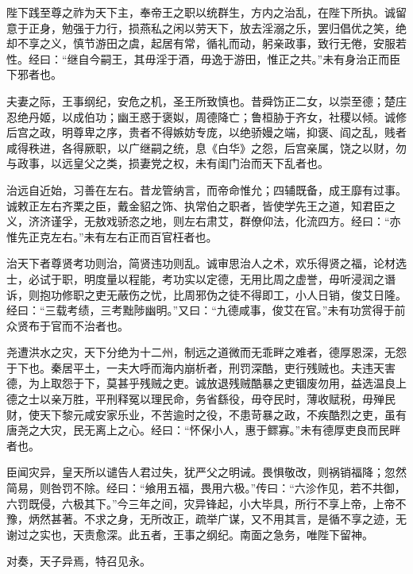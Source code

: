 \documentclass[12pt,UTF8]{ctexbook}
\begin{document}
陛下践至尊之祚为天下主，奉帝王之职以统群生，方内之治乱，在陛下所执。诚留意于正身，勉强于力行，损燕私之闲以劳天下，放去淫溺之乐，罢归倡优之笑，绝却不享之义，慎节游田之虞，起居有常，循礼而动，躬亲政事，致行无倦，安服若性。经曰：“继自今嗣王，其毋淫于酒，毋逸于游田，惟正之共。”未有身治正而臣下邪者也。



夫妻之际，王事纲纪，安危之机，圣王所致慎也。昔舜饬正二女，以崇至德；楚庄忍绝丹姬，以成伯功；幽王惑于褒姒，周德降亡；鲁桓胁于齐女，社稷以倾。诚修后宫之政，明尊卑之序，贵者不得嫉妨专庞，以绝骄嫚之端，抑褒、阎之乱，贱者咸得秩进，各得厥职，以广继嗣之统，息《白华》之怨，后宫亲属，饶之以财，勿与政事，以远皇父之类，损妻党之权，未有闺门治而天下乱者也。



治远自近始，习善在左右。昔龙管纳言，而帝命惟允；四辅既备，成王靡有过事。诚敕正左右齐栗之臣，戴金貂之饰、执常伯之职者，皆使学先王之道，知君臣之义，济济谨孚，无敖戏骄恣之地，则左右肃艾，群僚仰法，化流四方。经曰：“亦惟先正克左右。”未有左右正而百官枉者也。



治天下者尊贤考功则治，简贤违功则乱。诚审思治人之术，欢乐得贤之福，论材选士，必试于职，明度量以程能，考功实以定德，无用比周之虚誉，毋听浸润之谮诉，则抱功修职之吏无蔽伤之忧，比周邪伪之徒不得即工，小人日销，俊艾日隆。经曰：“三载考绩，三考黜陟幽明。”又曰：“九德咸事，俊艾在官。”未有功赏得于前众贤布于官而不治者也。



尧遭洪水之灾，天下分绝为十二州，制远之道微而无乖畔之难者，德厚恩深，无怨于下也。秦居平土，一夫大呼而海内崩析者，刑罚深酷，吏行残贼也。夫违天害德，为上取怨于下，莫甚乎残贼之吏。诚放退残贼酷暴之吏锢废勿用，益选温良上德之士以亲万胜，平刑释冤以理民命，务省繇役，毋夺民时，薄收赋税，毋殚民财，使天下黎元咸安家乐业，不苦逾时之役，不患苛暴之政，不疾酷烈之吏，虽有唐尧之大灾，民无离上之心。经曰：“怀保小人，惠于鳏寡。”未有德厚吏良而民畔者也。



臣闻灾异，皇天所以谴告人君过失，犹严父之明诫。畏惧敬改，则祸销福降；忽然简易，则咎罚不除。经曰：“飨用五福，畏用六极。”传曰：“六沴作见，若不共御，六罚既侵，六极其下。”今三年之间，灾异锋起，小大毕具，所行不享上帝，上帝不豫，炳然甚著。不求之身，无所改正，疏举广谋，又不用其言，是循不享之迹，无谢过之实也，天责愈深。此五者，王事之纲纪。南面之急务，唯陛下留神。



对奏，天子异焉，特召见永。
\end{document}
